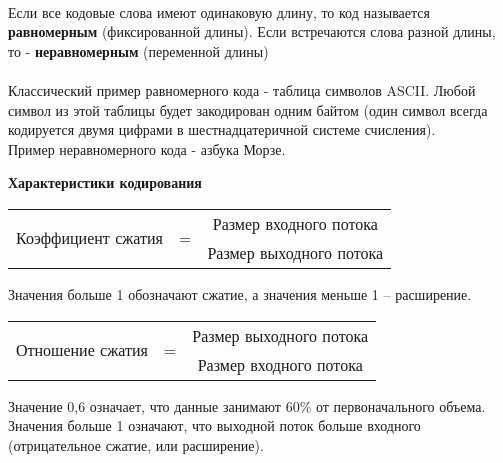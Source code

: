 \\Если все кодовые слова имеют одинаковую длину, то код называется \textbf{равномерным} (фиксированной длины). Если встречаются слова разной длины, то - \textbf{неравномерным} (переменной длины)
\\
\\Классический пример равномерного кода - таблица символов ASCII. Любой символ из этой таблицы будет закодирован одним байтом (один символ всегда кодируется двумя цифрами в шестнадцатеричной системе счисления).
\\Пример неравномерного кода - азбука Морзе.
\\
\begin{center}
  \textbf{Характеристики кодирования}
\end{center}
\begin{table}[h]
\begin{center}
\begin{tabular}{c c c}
\multirow{2}{*}{Коэффициент сжатия} & \multirow{2}{*}{ = }  & Размер входного потока  \\
\hhline{~~-}
 &  & Размер выходного потока
\end{tabular}
\end{center}
Значения больше 1 обозначают сжатие, а значения меньше 1 – расширение.
\end{table}
\begin{table}[h]
\begin{center}
\begin{tabular}{c c c}
\multirow{2}{*}{Отношение сжатия} & \multirow{2}{*}{ = }  & Размер выходного потока  \\
\hhline{~~-}
 &  & Размер входного потока
\end{tabular}
\end{center}
Значение 0,6 означает, что данные занимают 60\% от первоначального объема. Значения больше 1 означают, что выходной поток больше входного (отрицательное сжатие, или расширение).
\end{table}

